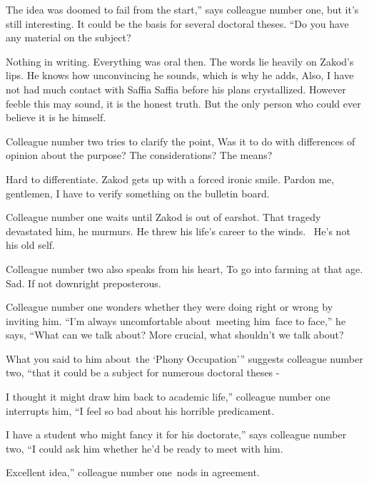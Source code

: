 \documentclass[letterpaper]{article}
\begin{document}
{\textquotedbl}The idea was doomed to fail from the start,'' says colleague number one, {\textquotedbl}but it's still
interesting. It could be the basis for several doctoral theses. ``Do you have any material on the
subject?{\textquotedbl} 

{\textquotedbl}Nothing in writing. Everything was oral then.{\textquotedbl} The words lie heavily on Zakod's lips. He
knows how unconvincing he sounds, which is why he adds, {\textquotedbl}Also, I have not had much contact with Saffia
Saffia before his plans crystallized.{\textquotedbl} However feeble this may sound, it is the honest truth. But the
only person who could ever believe it is he himself. 

Colleague number two tries to clarify the point, {\textquotedbl}Was it to do with differences of opinion about the
purpose? The considerations? The means?{\textquotedbl} 

{\textquotedbl}Hard to differentiate.{\textquotedbl} Zakod gets up with a forced ironic smile. {\textquotedbl}Pardon me,
gentlemen, I have to verify something on the bulletin board.{\textquotedbl}

Colleague number one waits until Zakod is out of earshot. {\textquotedbl}That tragedy devastated him,{\textquotedbl} he
murmurs. {\textquotedbl}He threw his life's career to the winds. \ He's not his old self.{\textquotedbl} 

Colleague number two also speaks from his heart, {\textquotedbl}To go into farming at that age. Sad. If not downright
preposterous.{\textquotedbl} 

Colleague number one wonders whether they were doing right or wrong by inviting him. ``I'm always uncomfortable
about~meeting him~face to face,'' he says, ``What can we talk about? More crucial, what shouldn't we talk
about?{\textquotedbl}

{\textquotedbl}What you said to him about~the `Phony Occupation'{}'' suggests colleague number two, ``that it could be a
subject for numerous doctoral theses -{\textquotedbl} 

{\textquotedbl}I thought it might draw him back to academic life,'' colleague number one interrupts him, ``I feel so bad
about his horrible predicament.{\textquotedbl} 

{\textquotedbl}I have a student who might fancy it for his doctorate,'' says colleague number two, ``I could ask him
whether he'd be ready to meet with him.{\textquotedbl} 

{\textquotedbl}Excellent idea,'' colleague number one~nods in agreement. 
\end{document}
